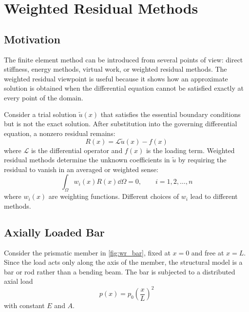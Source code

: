 \chapter{Weighted Residual Methods}
\label{ch:weighted_residuals}

\section{Motivation}

The finite element method can be introduced from several points of view:
direct stiffness, energy methods, virtual work, or weighted residual methods.
The weighted residual viewpoint is useful because it shows how an approximate
solution is obtained when the differential equation cannot be satisfied exactly
at every point of the domain.

Consider a trial solution $\tilde{u}(x)$ that satisfies the essential boundary
conditions but is not the exact solution. After substitution into the governing
differential equation, a nonzero residual remains:
\begin{equation}
    R(x) = \mathcal{L}\tilde{u}(x) - f(x)
    \label{eq:residual_definition}
\end{equation}
where $\mathcal{L}$ is the differential operator and $f(x)$ is the loading term.
Weighted residual methods determine the unknown coefficients in $\tilde{u}$ by
requiring the residual to vanish in an averaged or weighted sense:
\begin{equation}
    \int_{\Omega} w_i(x) R(x) \dd \Omega = 0,
    \qquad i = 1,2,\ldots,n
    \label{eq:weighted_residual_statement}
\end{equation}
where $w_i(x)$ are weighting functions. Different choices of $w_i$ lead to
different methods.

\section{Axially Loaded Bar}

Consider the prismatic member in \cref{fig:wr_bar}, fixed at $x=0$ and free at
$x=L$. Since the load acts only along the axis of the member, the structural
model is a bar or rod rather than a bending beam. The bar is subjected to a
distributed axial load
\begin{equation}
    p(x) = p_0 \left(\frac{x}{L}\right)^2
    \label{eq:wr_distributed_load}
\end{equation}
with constant $E$ and $A$.

